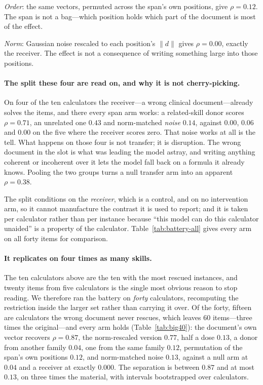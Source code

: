 \documentclass{article}
\newcommand{\dvec}{\ensuremath{d}}
\begin{document}
\emph{Order}: the same vectors, permuted across the span's own positions, give
$\rho = 0.12$. The span is not a bag---which position holds which part of the
document is most of the effect.

\emph{Norm}: Gaussian noise rescaled to each position's $\|\dvec\|$ gives
$\rho = 0.00$, exactly the receiver. The effect is not a consequence of writing
something large into those positions.

\paragraph{The split these four are read on, and why it is not cherry-picking.}
On four of the ten calculators the receiver---a wrong clinical document---already
solves the items, and there every span arm works: a related-skill donor scores
$\rho = 0.71$, an unrelated one $0.43$ and norm-matched \emph{noise} $0.14$,
against $0.00$, $0.06$ and $0.00$ on the five where the receiver scores zero.
That noise works at all is the tell. What happens on those four is not transfer; it
is disruption. The wrong document in the slot is what was leading the model
astray, and writing anything coherent or incoherent over it lets the model fall
back on a formula it already knows. Pooling the two groups turns a null transfer
arm into an apparent $\rho = 0.38$.

The split conditions on the \emph{receiver}, which is a control, and on no
intervention arm, so it cannot manufacture the contrast it is used to report; and
it is taken per calculator rather than per instance because ``this model can do
this calculator unaided'' is a property of the calculator. Table~\ref{tab:battery-all}
gives every arm on all forty items for comparison.

\paragraph{It replicates on four times as many skills.} The ten calculators
above are the ten with the most rescued instances, and twenty items from five
calculators is the single most obvious reason to stop reading. We therefore ran
the battery on \emph{forty} calculators, recomputing the restriction inside the
larger set rather than carrying it over. Of the forty, fifteen are calculators
the wrong document never rescues, which leaves $60$ items---three times the
original---and every arm holds (Table~\ref{tab:big40}): the document's own
vector recovers $\rho = 0.87$, the norm-rescaled version $0.77$, half a dose
$0.13$, a donor from another family $0.04$, one from the same family $0.12$,
permutation of the span's own positions $0.12$, and norm-matched noise $0.13$,
against a null arm at $0.04$ and a receiver at exactly $0.000$. The separation
is between $0.87$ and at most $0.13$, on three times the material, with
intervals bootstrapped over calculators.
\end{document}
